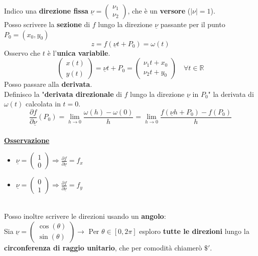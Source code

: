 \documentclass[a4paper, oneside]{article}
\newcommand\R{\mathbb{R}}
\newcommand\de{\partial}
\begin{document}
    \noindent Indico una \textbf{direzione fissa} $\underline{\nu} = \begin{pmatrix}
        \nu_1 \\ \nu_2
    \end{pmatrix}$, che è un \textbf{versore} ($|\nu|=1$).\\ 
    Posso scrivere la \textbf{sezione} di $f$ lungo la direzione $\underline{\nu}$ passante per il punto $P_0 = (x_0,y_0)$
    \[z = f(\underline{\nu} t + P_0) = \omega(t)\]
    Osservo che $t$ è l'\textbf{unica variabile}. 
    \[\begin{pmatrix}
        x(t) \\ y(t)
    \end{pmatrix} = \underline{\nu} t + P_0 = \begin{pmatrix}
        \nu_1 t + x_0 \\ \nu_2 t + y_0
    \end{pmatrix}\quad\forall t\in\R\]
    Posso passare alla \textbf{derivata}.\\

    \noindent Definisco la "\textbf{derivata direzionale} di $f$ lungo la direzione $\underline{\nu}$ in $P_0$" la 
    derivata di $\omega(t)$ calcolata in $t=0$.\\
    \[\frac{\de f}{\de \underline{\nu}}(P_0) = \lim_{h\to 0} \frac{\omega(h) - \omega(0)}{h} = \lim_{h\to 0} \frac{f(\underline{\nu}h + P_0) - f(P_0)}{h}\]
    \hfill\\
    \noindent\textbf{\underline{Osservazione}}
    \begin{itemize}
        \item $\displaystyle \underline{\nu} = \begin{pmatrix}
            1 \\ 0
        \end{pmatrix} \Longrightarrow \frac{\de f}{\de \underline{\nu}} = f_x$
        \item $\displaystyle \underline{\nu} = \begin{pmatrix}
            0 \\ 1
        \end{pmatrix} \Longrightarrow \frac{\de f}{\de \underline{\nu}} = f_y$
    \end{itemize}

    \hfill\\
    \noindent Posso inoltre scrivere le direzioni usando un \textbf{angolo}:\\
    Sia $\displaystyle\underline{\nu} = \begin{pmatrix}
        \cos(\theta) \\ \sin(\theta)
    \end{pmatrix} \longrightarrow$ Per $\theta\in[0,2\pi]$ esploro \textbf{tutte le direzioni} lungo la \textbf{circonferenza di raggio unitario},
    che per comodità chiamerò $\$'$.\\
\end{document}
